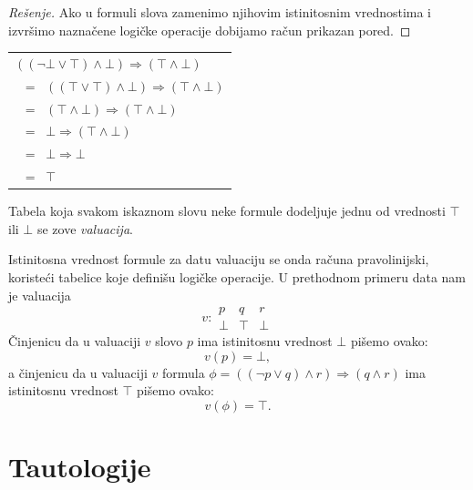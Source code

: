 \bigskip

\noindent
\begin{minipage}[t]{2in}
  \begin{proof}[Re\v senje]
    Ako u formuli slova zamenimo njihovim istinitosnim vrednostima i izvr\v simo nazna\v cene
    logi\v cke operacije dobijamo ra\v cun prikazan pored.
  \end{proof}
\end{minipage}\hfill
\begin{minipage}[t]{3.5in}
  \begin{center}
  \begin{tabular}[t]{l}
  $ ((\lnot \bot \lor \top) \land \bot) \Rightarrow (\top \land \bot)$\\
  $\;\;=\;\; ((\top \lor \top) \land \bot) \Rightarrow (\top \land \bot) $\\
  $\;\;=\;\; (\top  \land \bot) \Rightarrow (\top \land \bot) $\\
  $\;\;=\;\; \bot \Rightarrow (\top \land \bot) $\\
  $\;\;=\;\; \bot \Rightarrow \bot $\\
  $\;\;=\;\; \top$
  \end{tabular}
  \end{center}
\end{minipage}\par

\begin{DEF}
  Tabela koja svakom iskaznom slovu neke formule dodeljuje jednu od vrednosti
  $\top$ ili $\bot$ se zove \emph{valuacija}.
\end{DEF}

Istinitosna vrednost formule za datu valuaciju
se onda ra\v cuna pravolinijski, koriste\'ci tabelice koje defini\v su logi\v cke operacije.
U prethodnom primeru data nam je valuacija
  $$
    v : \begin{array}{ccc}
    p & q & r \\
    \hline
    \bot & \top & \bot
    \end{array}
  $$
\v Cinjenicu da u valuaciji $v$ slovo $p$ ima istinitosnu vrednost $\bot$ pi\v semo ovako:
$$
  v(p) = \bot,
$$
a \v cinjenicu da u valuaciji $v$ formula $\phi = ((\lnot p \lor q) \land r) \Rightarrow (q \land r)$
ima istinitosnu vrednost $\top$ pi\v semo ovako:
$$
  v(\phi) = \top.
$$

\section{Tautologije}

